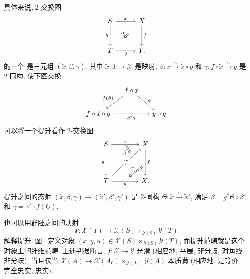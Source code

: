 \begin{remark}\label{src:4.7.3}
具体来说, $2$-交换图
\begin{equation}\label{src:4.7.4}
\begin{tikzcd}[column sep=3em,row sep=3em]
S\arrow[r,"x"]\arrow[d,"g"']&\mathcal X\arrow[d,"f"]\\
T\arrow[r,"y"']&\mathcal Y,
\arrow[Rightarrow,from=1-2,to=2-1,shorten <=1.7em,shorten >=1.7em,"\alpha"']
\end{tikzcd}
\end{equation}
的一个 是三元组 $(\widetilde x,\beta,\gamma)$, 其中 $\widetilde x:T\to\mathcal X$ 是映射, $\beta:x\xrightarrow{\sim}\widetilde x\circ g$ 和 $\gamma:f\circ\widetilde x\xrightarrow{\sim}y$ 是 $2$-同构, 使下图交换:
\[
\begin{tikzcd}[column sep=small]
{}&f\circ x\arrow[dl,"f(\beta)"']\arrow[dr,"\alpha"]&{}\\
f\circ\widetilde x\circ g\arrow[rr,"g^*\gamma"']&{}&y\circ g
\end{tikzcd}
\]
可以将一个提升看作 $2$-交换图
\[
\begin{tikzcd}[column sep=4em,row sep=4em]
S\arrow[r,"x",""{name=top}]\arrow[d,"g"']&\mathcal X\arrow[d,"f",""{name=right,pos=.55}]\\
T\arrow[r,"y"',""{name=bottom}]\arrow[ur,"\widetilde x" description,""{name=upper,pos=.72},""{name=lower,pos=.28}]&\mathcal X.
\arrow[from=top,to=upper,Rightarrow,"\beta"']
\arrow[from=right,to=bottom,Rightarrow,shorten <=.4em,shorten >=.4em,"\gamma"']
\end{tikzcd}
\]
提升之间的态射 $(\widetilde x,\beta,\gamma)\to(\widetilde x',\beta',\gamma')$ 是 $2$-同构 $\Theta:\widetilde x\xrightarrow{\sim}\widetilde x'$, 满足 $\beta=g^*\Theta\circ\beta'$ 和 $\gamma=\gamma'\circ f(\Theta)$.

也可以用群胚之间的映射
\[
\Psi:\mathcal X(T)\longrightarrow\mathcal X(S)\times_{\mathcal Y(S)}\mathcal Y(T)
\]
解释提升. 图~ 定义对象 $(x,y,\alpha)\in\mathcal X(S)\times_{\mathcal Y(S)}\mathcal Y(T)$, 而提升范畴就是这个对象上的纤维范畴. 上述判据断言, $f:\mathcal X\to\mathcal Y$ 光滑 (相应地, 平展, 非分歧, 对角线非分歧), 当且仅当 $\mathcal X(A)\to\mathcal X(A_0)\times_{\mathcal Y(A_0)}\mathcal Y(A)$ 本质满 (相应地, 是等价, 完全忠实, 忠实).
\end{remark}
